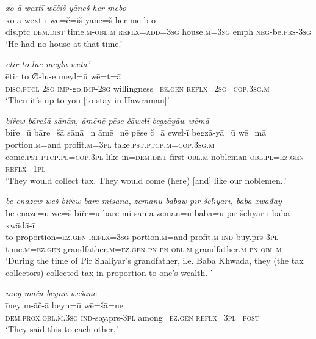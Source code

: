 \ea \label{ŽP.219}
\textit{xo ā wextī wēčiš yāneš her mebo} \\ 
\gll xo ā wext-ī wē=č=iš yāne=š her me-b-o \\ 
 dis.ptc \textsc{dem.dist} time\textsc{.m}\textsc{-obl}\textsc{.m} \textsc{reflx}\textsc{=add}\textsc{=3sg} house\textsc{.m}\textsc{=3sg} emph \textsc{neg-}be\textsc{.prs}\textsc{-3sg} \\ 
\glt `He had no house at that time.'
\z 
 
\ea \label{ŽP.263}
\textit{ētir to lue meylū wētā’} \\ 
\gll ētir to ∅-lu-e meyl=ū wē=t=ā \\ 
 \textsc{disc.ptcl} \textsc{2sg} \textsc{imp-}go.\textsc{imp-}\textsc{2sg} willingness\textsc{\textsc{=ez.gen}} \textsc{reflx}\textsc{=\textsc{2sg}}\textsc{=cop}\textsc{.3sg}\textsc{.m} \\ 
\glt `Then it’s up to you [to stay in Hawraman]'
\z 
 
\ea \label{BP.12}
\textit{biřew bārešā sānān, āmēnē pēse čāweɫī begzāyāw wēmā} \\ 
\gll biře=ū bāre=šā sānā=n āmē=nē pēse č=ā eweɫ-ī begzā-yā=ū wē=mā \\ 
 portion\textsc{.m}=and profit\textsc{.m}\textsc{=3pl} take\textsc{.pst}\textsc{.ptcp}\textsc{.m}\textsc{=cop}\textsc{.3sg}\textsc{.m} come\textsc{.pst}\textsc{.ptcp}\textsc{.pl}\textsc{=cop}\textsc{.3pl} like in=\textsc{dem.dist} first\textsc{-obl}\textsc{.m} nobleman\textsc{-obl}\textsc{.pl}\textsc{=ez.gen} \textsc{reflx}\textsc{=\textsc{1pl}} \\ 
\glt `They would collect tax. They would come (here) [and] like our noblemen..'
\z 
 
\ea \label{BP.31}
\textit{be enāzew wēš biřew bāre misānā, zemānū bābāw pīr šelīyārī, bābā xwāđāy} \\ 
\gll be enāze=ū wē=š biře=ū bāre mi-sān-ā zemān=ū bābā=ū pīr šelīyār-ī bābā xwāđā-ī \\ 
 to proportion\textsc{=ez.gen} \textsc{reflx}\textsc{=3sg} portion\textsc{.m}=and profit\textsc{.m} \textsc{ind-}buy.prs\textsc{-3pl} time\textsc{.m}\textsc{=ez.gen} grandfather\textsc{.m}\textsc{=ez.gen} \textsc{pn} \textsc{pn}\textsc{-obl}\textsc{.m} grandfather\textsc{.m} \textsc{pn}\textsc{-obl}\textsc{.m} \\ 
\glt `During the time of Pir Shaliyar’s grandfather, i.e. Baba Khwada, they (the tax collectors) collected tax in proportion to one’s wealth. '
\z 
 
\ea \label{BP.66}
\textit{īney māčā beynū wēšāne} \\ 
\gll īney m-āč-ā beyn=ū wē=šā=ne \\ 
 \textsc{dem.prox}\textsc{.obl}\textsc{.m}\textsc{.3sg} \textsc{ind-}say.prs\textsc{-3pl} among\textsc{=ez.gen} \textsc{reflx}\textsc{=3pl}\textsc{=\textsc{post}} \\ 
\glt `They said this to each other,'
\z 
 
